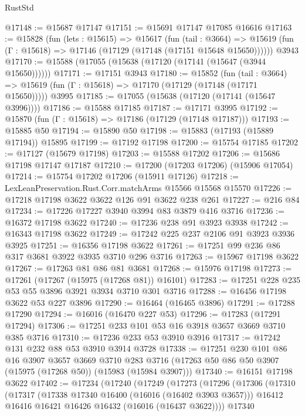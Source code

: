 \begin{lexlean}{RustStd}
\begin{coremodule}
@17148 := @15687 @17147
@17151 := @15691 @17147 @17085 @16616
@17163 := @15828
    (fun (lets : @15615) =>
    @15617
      (fun (tail : @3664) =>
      @15619 (fun (Γ : @15618) => @17146 (@17129 (@17148 (@17151 @15648 @15650))))))
    @3943
@17170 := @15588 (@17055 (@15638 (@17120 (@17141 (@15647 (@3944 @15650))))))
@17171 := @17151 @3943
@17180 := @15852
    (fun (tail : @3664) => @15619 (fun (Γ : @15618) => @17170 (@17129 (@17148 (@17171 @15650)))))
    @3995
@17185 := @17055 (@15638 (@17120 (@17141 (@15647 @3996))))
@17186 := @15588 @17185
@17187 := @17171 @3995
@17192 := @15870 (fun (Γ : @15618) => @17186 (@17129 (@17148 @17187)))
@17193 := @15885 @50
@17194 := @15890 @50
@17198 := @15883 (@17193 (@15889 @17194)) @15895
@17199 := @17192 @17198
@17200 := @15754 @17185
@17202 := @17127 (@15679 @17198)
@17203 := @15588 @17202
@17206 := @15686 @17198 @17147 @17187
@17210 := @17200 (@17203 @17206) (@15906 @17054)
@17214 := @15754 @17202 @17206 (@15911 @17126)
@17218 := LexLeanPreservation.Rust.Corr.matchArms @15566 @15568 @15570
@17226 := @17218 @17198 @3622 @3622 @126 @91 @3622 @238 @261
@17227 := @216 @84
@17234 := @17226 @17227 @3940 @3994 @83 @3879 @416 @3716
@17236 := @16372 @17198 @3622
@17240 := @17236 @238 @91 @3923 @3938
@17242 := @16343 @17198 @3622
@17249 := @17242 @225 @237 @2106 @91 @3923 @3936 @3925
@17251 := @16356 @17198 @3622
@17261 := @17251 @99 @236 @86 @317 @3681 @3922 @3935 @3710 @296 @3716
@17263 := @15967 @17198 @3622
@17267 := @17263 @81 @86 @81 @3681
@17268 := @15976 @17198
@17273 := @17261 (@17267 (@15975 (@17268 @81)) @16101)
@17283 := @17251 @228 @235 @53 @55 @3896 @3921 @3934 @3710 @301 @3716
@17288 := @16456 @17198 @3622 @53 @227 @3896
@17290 := @16464 (@16465 @3896)
@17291 := @17288 @17290
@17294 := @16016 (@16470 @227 @53)
@17296 := @17283 (@17291 @17294)
@17306 := @17251 @233 @101 @53 @16 @3918 @3657 @3669 @3710 @385 @3716
@17310 := @17236 @233 @53 @3910 @3916
@17317 := @17242 @131 @232 @88 @53 @3910 @3914 @3728
@17338 := @17251
    @230
    @101
    @86
    @16
    @3907
    @3657
    @3669
    @3710
    @283
    @3716
    (@17263 @50 @86 @50 @3907 (@15975 (@17268 @50)) (@15983 (@15984 @3907)))
@17340 := @16151 @17198 @3622
@17402 := @17234
    (@17240
      (@17249
        (@17273
          (@17296
            (@17306
              (@17310
                (@17317
                  (@17338 @17340 @16400 (@16016 (@16402 @3903 @3657)))
                  @16412
                  @16416
                  @16421
                  @16426
                  @16432
                  (@16016 (@16437 @3622))))
              @17340

\end{coremodule}
\end{lexlean}
